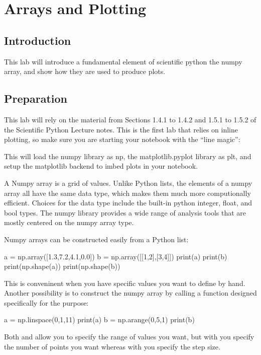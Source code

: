 \chapter{Arrays and Plotting}

\section{Introduction}

This lab will introduce a fundamental element of scientific python the
numpy array, and show how they are used to produce plots.

\section{Preparation}

This lab will rely on the material from Sections 1.4.1 to 1.4.2 and
1.5.1 to 1.5.2 of the Scientific Python Lecture notes.  This is the
first lab that relies on inline plotting, so make sure you are
starting your notebook with the ``line magic'':
\begin{python}
\end{python}
This will load the numpy library as np, the matplotlib.pyplot library
as plt, and setup the matplotlib backend to imbed plots in your
notebook.

A Numpy array is a grid of values.  Unlike Python lists, the elements
of a numpy array all have the same data type, which makes them much
more computionally efficient.  Choices for the data type include the
built-in python integer, float, and bool types.  The numpy library
provides a wide range of analysis tools that are mostly centered on
the numpy array type.

Numpy arrays can be constructed easily from a Python list:
\begin{python}
a = np.array([1.3,7.2,4.1,0.0])
b = np.array([[1,2],[3,4]])
print(a)
print(b)
print(np.shape(a))
print(np.shape(b))
\end{python}
This is conveninent when you have specific values you want to define by hand.  Another possibility is to construct the numpy array by calling a function designed specifically for the purpose:
\begin{python}
a = np.linspace(0,1,11)
print(a)
b = np.arange(0,5,1)
print(b)
\end{python}
Both  and  allow you to specify the range
of values you want, but with  you specify the number of
points you want whereas with  you specify the step size.

